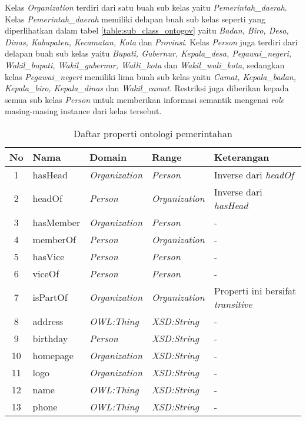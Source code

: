 Kelas \emph{Organization} terdiri dari satu buah sub kelas yaitu \emph{Pemerintah\_daerah}. Kelas \emph{Pemerintah\_daerah} memiliki delapan buah sub kelas seperti yang diperlihatkan dalam tabel \ref{table:sub_class_ontogov} yaitu \emph{Badan, Biro, Desa, Dinas, Kabupaten, Kecamatan, Kota} dan \emph{Provinsi}. Kelas \emph{Person} juga terdiri dari delapan buah sub kelas yaitu \emph{Bupati, Gubernur, Kepala\_desa, Pegawai\_negeri, Wakil\_bupati, Wakil\_gubernur, Walli\_kota} dan \emph{Wakil\_wali\_kota}, sedangkan kelas \emph{Pegawai\_negeri} memiliki lima buah sub kelas yaitu \emph{Camat, Kepala\_badan, Kepala\_biro, Kepala\_dinas} dan \emph{Wakil\_camat}. Restriksi juga diberikan kepada semua sub kelas \emph{Person} untuk memberikan informasi semantik mengenai \emph{role} masing-masing instance dari kelas tersebut.

\begin{table}[t]
	\caption{Daftar properti ontologi pemerintahan}
	\label{tab:ontogov_property}
	\centering

	\begin{tabularx}{\textwidth}{|c|l|l|l|X|}
	\hline

	\hline
	\textbf{No} & \textbf{Nama} & \textbf{Domain} & \textbf{Range} & \textbf{Keterangan} \\
	\hline
		1 & hasHead & \emph{Organization} & \emph{Person} & Inverse dari \emph{headOf} \\
	\hline
		2 & headOf & \emph{Person} & \emph{Organization} & Inverse dari \emph{hasHead} \\
	\hline
		3 & hasMember & \emph{Organization} & \emph{Person} & - \\
	\hline
		4 & memberOf & \emph{Person} & \emph{Organization} & - \\
	\hline
		5 & hasVice & \emph{Person} & \emph{Person} & - \\
	\hline
		6 & viceOf & \emph{Person} & \emph{Person} & - \\
	\hline
		7 & isPartOf & \emph{Organization} & \emph{Organization} & Properti ini bersifat \emph{transitive} \\
	\hline
		8 & address & \emph{OWL:Thing} & \emph{XSD:String} & - \\
	\hline
		9 & birthday & \emph{Person} & \emph{XSD:String} & - \\
	\hline
		10 & homepage & \emph{Organization} & \emph{XSD:String} & - \\
	\hline
		11 & logo & \emph{Organization} & \emph{XSD:String} & - \\
	\hline
		12 & name & \emph{OWL:Thing} & \emph{XSD:String} & - \\
	\hline
		13 & phone & \emph{OWL:Thing} & \emph{XSD:String} & - \\
	\hline
	\end{tabularx}
\end{table}

